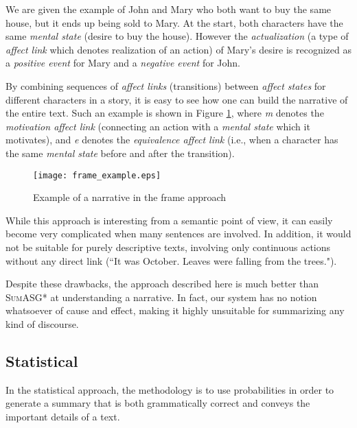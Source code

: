 We are given the example of John and Mary who both want to buy the same house, but it ends up being sold to Mary. At the start, both characters have the same \textit{mental state} (desire to buy the house). However the \textit{actualization} (a type of \textit{affect link} which denotes realization of an action) of Mary's desire is recognized as a \textit{positive event} for Mary and a \textit{negative event} for John.

By combining sequences of \textit{affect links} (transitions) between \textit{affect states} for different characters in a story, it is easy to see how one can build the narrative of the entire text. Such an example is shown in Figure \ref{fig:frame_example}, where \textit{m} denotes the \textit{motivation affect link} (connecting an action with a \textit{mental state} which it motivates), and \textit{e} denotes the \textit{equivalence affect link} (i.e., when a character has the same \textit{mental state} before and after the transition).

\begin{figure}[H]
\centering
\texttt{[image: frame\_example.eps]}
\caption{\cite{lehnert_1980_nodate} Example of a narrative in the frame approach}
\label{fig:frame_example}
\end{figure}

\noindent
While this approach is interesting from a semantic point of view, it can easily become very complicated when many sentences are involved. In addition, it would not be suitable for purely descriptive texts, involving only continuous actions without any direct link (``It was October. Leaves were falling from the trees.").

Despite these drawbacks, the approach described here is much better than \textsc{SumASG*} at understanding a narrative. In fact, our system has no notion whatsoever of cause and effect, making it highly unsuitable for summarizing any kind of discourse.

\subsection{Statistical}

In the statistical approach, the methodology is to use probabilities in order to generate a summary that is both grammatically correct and conveys the important details of a text.

\mbox{}

